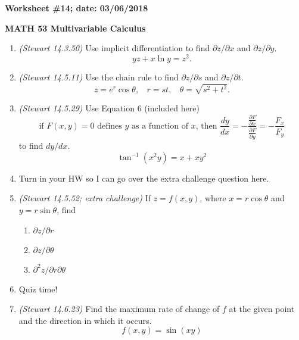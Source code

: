 \documentclass{article}
\begin{document}
{\bf Worksheet \#14; date: 03/06/2018}

{\bf MATH 53 Multivariable Calculus}

\begin{enumerate}
\item {\em (Stewart 14.3.50)} Use implicit differentiation to find $\partial z / \partial x$ and $\partial z / \partial y$.
\[
yz + x \ln y = z^2.
\]

\item {\em (Stewart 14.5.11)} Use the chain rule to find $\partial z / \partial s$ and $\partial z / \partial t$.
\[
z = e^r \cos \theta, ~~~~ r = st, ~~~~ \theta = \sqrt{s^2 + t^2}.
\]

\item {\em (Stewart 14.5.29)} Use Equation 6 (included here)
\[
\text{if } F(x, y) = 0 \text{ defines $y$ as a function of $x$, then } \frac{dy}{dx} = -\frac{\frac{\partial F}{\partial x}}{\frac{\partial F}{\partial y}} = -\frac{F_x}{F_y}
\]
to find $dy / dx$.
\[
\tan^{-1}(x^2 y) = x + xy^2
\]

\item Turn in your HW so I can go over the extra challenge question here.

\item {\em (Stewart 14.5.52; extra challenge)} If $z = f(x, y)$, where $x = r \cos \theta$ and $y = r \sin \theta$, find
\begin{enumerate}
\item $\partial z / \partial r$
\item $\partial z / \partial \theta$
\item $\partial^2 z / \partial r \partial \theta$
\end{enumerate}

\item Quiz time!

\item {\em (Stewart 14.6.23)} Find the maximum rate of change of $f$ at the given point and the direction in which it occurs.
\[
f(x, y) = \sin(xy)
\]
\end{enumerate}
\end{document}
